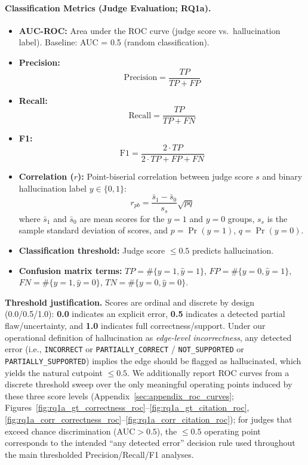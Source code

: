 \paragraph{Classification Metrics (Judge Evaluation; RQ1a).}
\begin{itemize}[noitemsep]
    \item \textbf{AUC-ROC:} Area under the ROC curve (judge score vs.\ hallucination label). Baseline: AUC = 0.5 (random classification).
    \item \textbf{Precision:}
    \begin{equation}
        \mathrm{Precision} = \frac{TP}{TP + FP}
    \end{equation}
    \item \textbf{Recall:}
    \begin{equation}
        \mathrm{Recall} = \frac{TP}{TP + FN}
    \end{equation}
    \item \textbf{F1:}
    \begin{equation}
        \mathrm{F1} = \frac{2 \cdot TP}{2 \cdot TP + FP + FN}
    \end{equation}
    \item \textbf{Correlation ($r$):} Point-biserial correlation between judge score $s$ and binary hallucination label $y\in\{0,1\}$:
    \begin{equation}
        r_{pb}=\frac{\bar{s}_1-\bar{s}_0}{s_s}\sqrt{pq}
    \end{equation}
    where $\bar{s}_1$ and $\bar{s}_0$ are mean scores for the $y{=}1$ and $y{=}0$ groups, $s_s$ is the sample standard deviation of scores, and $p=\Pr(y{=}1)$, $q=\Pr(y{=}0)$.
    \item \textbf{Classification threshold:} Judge score $\leq 0.5$ predicts hallucination.
    \item \textbf{Confusion matrix terms:} $TP=\#\{y{=}1,\hat{y}{=}1\}$, $FP=\#\{y{=}0,\hat{y}{=}1\}$, $FN=\#\{y{=}1,\hat{y}{=}0\}$, $TN=\#\{y{=}0,\hat{y}{=}0\}$.
\end{itemize}

\noindent\textbf{Threshold justification.} Scores are ordinal and discrete by design (0.0/0.5/1.0): \textbf{0.0} indicates an explicit error, \textbf{0.5} indicates a detected partial flaw/uncertainty, and \textbf{1.0} indicates full correctness/support. Under our operational definition of hallucination as \emph{edge-level incorrectness}, any detected error (i.e., \texttt{INCORRECT} or \texttt{PARTIALLY\_CORRECT} / \texttt{NOT\_SUPPORTED} or \texttt{PARTIALLY\_SUPPORTED}) implies the edge should be flagged as hallucinated, which yields the natural cutpoint \(\le 0.5\). We additionally report ROC curves from a discrete threshold sweep over the only meaningful operating points induced by these three score levels (Appendix~\ref{sec:appendix_roc_curves}; Figures~\ref{fig:rq1a_gt_correctness_roc}--\ref{fig:rq1a_gt_citation_roc}, \ref{fig:rq1a_corr_correctness_roc}--\ref{fig:rq1a_corr_citation_roc}); for judges that exceed chance discrimination (AUC$>0.5$), the \(\le 0.5\) operating point corresponds to the intended ``any detected error'' decision rule used throughout the main thresholded Precision/Recall/F1 analyses.

